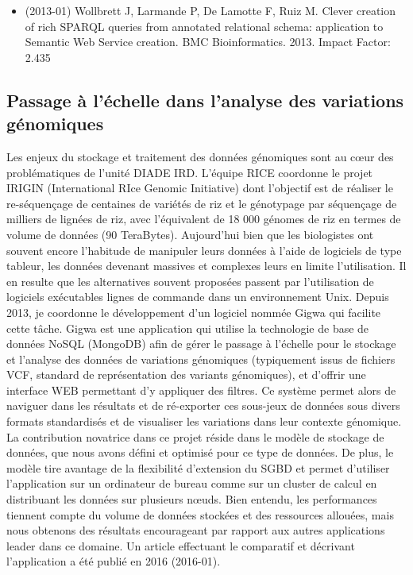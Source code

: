 \begin{itemize}

\item (2013-01) Wollbrett J, Larmande P, De Lamotte F, Ruiz M. Clever creation of rich SPARQL queries from annotated relational schema: application to Semantic Web Service creation. BMC Bioinformatics. 2013. Impact Factor: 2.435
\end{itemize}

\subsection*{Passage à l’échelle dans l’analyse des variations génomiques}
\label{GIGWA}

Les enjeux du stockage et traitement des données génomiques sont au cœur des problématiques de l’unité DIADE IRD. L’équipe RICE coordonne le projet IRIGIN (International RIce Genomic Initiative) dont l’objectif est de réaliser le re-séquençage de centaines de variétés de riz et le génotypage par séquençage de milliers de lignées de riz, avec l’équivalent de 18 000 génomes de riz en termes de volume de données (90 TeraBytes). Aujourd'hui bien que les biologistes ont souvent encore l'habitude de manipuler leurs données à l'aide de logiciels de type tableur, les données devenant massives et complexes leurs en limite l'utilisation. Il en resulte que les alternatives souvent proposées passent par l’utilisation de logiciels exécutables lignes de commande dans un environnement Unix.
Depuis 2013, je coordonne le développement d’un logiciel nommée Gigwa qui facilite cette tâche. Gigwa est une application qui utilise la technologie de base de données NoSQL (MongoDB) afin de gérer le passage à l’échelle pour le stockage et l’analyse des données de variations génomiques (typiquement issus de fichiers VCF, standard de représentation des variants génomiques), et d’offrir une interface WEB permettant d’y appliquer des filtres. Ce système permet alors de naviguer dans les résultats et de ré-exporter ces sous-jeux de données sous divers formats standardisés et de visualiser les variations dans leur contexte génomique. La contribution novatrice dans ce projet réside dans le modèle de stockage de données, que nous avons défini et optimisé pour ce type de données. De plus, le modèle tire avantage de la flexibilité d’extension du SGBD et permet d’utiliser l’application sur un ordinateur de bureau comme sur un cluster de calcul en distribuant les données sur plusieurs nœuds. Bien entendu, les performances tiennent compte du volume de données stockées et des ressources allouées, mais nous obtenons des résultats encourageant par rapport aux autres applications leader dans ce domaine. Un article effectuant le comparatif et décrivant l'application a été publié en 2016 (2016-01).

